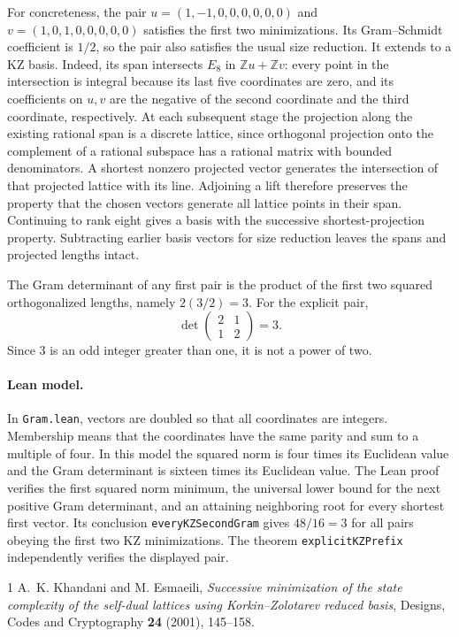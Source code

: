 \documentclass[11pt]{article}
\begin{document}
For concreteness, the pair \(u=(1,-1,0,0,0,0,0,0)\) and
\(v=(1,0,1,0,0,0,0,0)\) satisfies the first two minimizations. Its
Gram--Schmidt coefficient is \(1/2\), so the pair also satisfies the usual
size reduction. It extends to a KZ basis. Indeed, its span intersects \(E_8\) in
\(\mathbb Zu+\mathbb Zv\): every point in the intersection is integral because
its last five coordinates are zero, and its coefficients on \(u,v\) are
the negative of the second coordinate and the third coordinate,
respectively. At each subsequent stage the projection along the existing
rational span is a discrete lattice, since orthogonal projection onto the
complement of a rational subspace has a rational matrix with bounded
denominators. A shortest nonzero projected vector generates the
intersection of that projected lattice with its line. Adjoining a lift
therefore preserves the property that the chosen vectors generate all
lattice points in their span. Continuing to rank eight gives a basis with
the successive shortest-projection property. Subtracting earlier basis
vectors for size reduction leaves the spans and projected lengths intact.

The Gram determinant of any first pair is the product of the first two
squared orthogonalized lengths, namely \(2(3/2)=3\). For the explicit pair,
\[
 \det\begin{pmatrix}2&1\\1&2\end{pmatrix}=3.
\]
Since \(3\) is an odd integer greater than one, it is not a power of two.

\paragraph{Lean model.} In \texttt{Gram.lean}, vectors are doubled so that all
coordinates are integers. Membership means that the coordinates have the
same parity and sum to a multiple of four. In this model the squared norm
is four times its Euclidean value and the Gram determinant is sixteen
times its Euclidean value. The Lean proof verifies the first squared norm
minimum, the universal lower bound for the next positive Gram determinant,
and an attaining neighboring root for every shortest first vector. Its
conclusion \texttt{everyKZSecondGram} gives \(48/16=3\) for all pairs obeying
the first two KZ minimizations. The theorem \texttt{explicitKZPrefix}
independently verifies the displayed pair.

\begin{thebibliography}{1}
A.~K. Khandani and M. Esmaeili, \emph{Successive minimization of the state
complexity of the self-dual lattices using Korkin--Zolotarev reduced basis},
Designs, Codes and Cryptography \textbf{24} (2001), 145--158.
\end{thebibliography}
\end{document}
